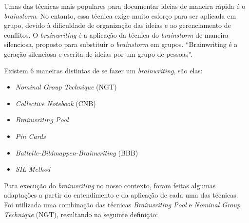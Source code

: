 Umas das técnicas mais populares para documentar ideias de maneira rápida é o \textit{brainstorm}. No entanto, essa técnica exige muito esforço para ser aplicada em grupo, devido à dificuldade de organização das ideias e ao gerenciamento de conflitos.
O \textit{brainwriting} é a aplicação da técnica do \textit{brainstorm} de maneira silenciosa, proposto para substituir o \textit{brainstorm} em grupos. 
“Brainwriting é a geração silenciosa e escrita de ideias por um grupo de pessoas”. \cite{vangundy1984brain}

Existem 6 maneiras distintas de se fazer um \textit{brainwriting}, são elas:

\begin{itemize}
\item \textit{Nominal Group Technique} (NGT)
\item \textit{Collective Notebook} (CNB)
\item \textit{Brainwriting Pool}
\item \textit{Pin Cards}
\item \textit{Battelle-Bildmappen-Brainwriting} (BBB)
\item \textit{SIL Method}
\end{itemize}

Para execução do \textit{brainwriting} no nosso contexto, foram feitas algumas adaptações a partir do entendimento e da aplicação de cada uma das técnicas.
Foi utilizada uma combinação das técnicas \textit{Brainwriting Pool} e  \textit{Nominal Group Technique} (NGT), resultando na seguinte definição:

